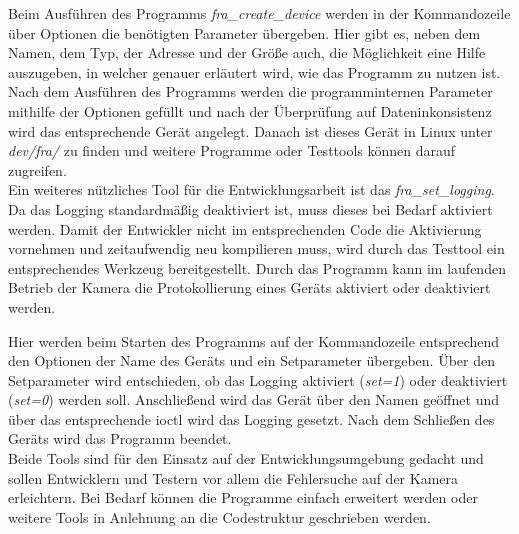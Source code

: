 Beim Ausführen des Programms \textit{fra\_create\_device} werden in der Kommandozeile über Optionen die benötigten Parameter übergeben. Hier gibt es, neben dem Namen, dem Typ, der Adresse und der Größe auch, die Möglichkeit eine Hilfe auszugeben, in welcher genauer erläutert wird, wie das Programm zu nutzen ist. 
Nach dem Ausführen des Programms werden die programminternen Parameter mithilfe der Optionen gefüllt und nach der Überprüfung auf Dateninkonsistenz wird das entsprechende Gerät angelegt. 
Danach ist dieses Gerät in Linux unter \textit{dev/fra/} zu finden und weitere Programme oder Testtools können darauf zugreifen.\\

Ein weiteres nützliches Tool für die Entwicklungsarbeit ist das \textit{fra\_set\_logging}. Da das Logging standardmäßig deaktiviert ist, muss dieses bei Bedarf aktiviert werden. Damit der Entwickler nicht im entsprechenden Code die Aktivierung vornehmen und zeitaufwendig neu kompilieren muss, wird durch das Testtool ein entsprechendes Werkzeug bereitgestellt. Durch das Programm kann im laufenden Betrieb der Kamera die Protokollierung eines Geräts aktiviert oder deaktiviert werden.


Hier werden beim Starten des Programms auf der Kommandozeile entsprechend den Optionen der Name des Geräts und ein Setparameter übergeben. 
Über den Setparameter wird entschieden, ob das Logging aktiviert (\textit{set=1}) oder deaktiviert (\textit{set=0}) werden soll. Anschließend wird das Gerät über den Namen geöffnet und über das entsprechende \ac{ioctl} wird das Logging gesetzt. Nach dem Schließen des Geräts wird das Programm beendet. \\


Beide Tools sind für den Einsatz auf der Entwicklungsumgebung gedacht und sollen Entwicklern und Testern vor allem die Fehlersuche auf der Kamera erleichtern. Bei Bedarf können die Programme einfach erweitert werden oder weitere Tools in Anlehnung an die Codestruktur geschrieben werden. 